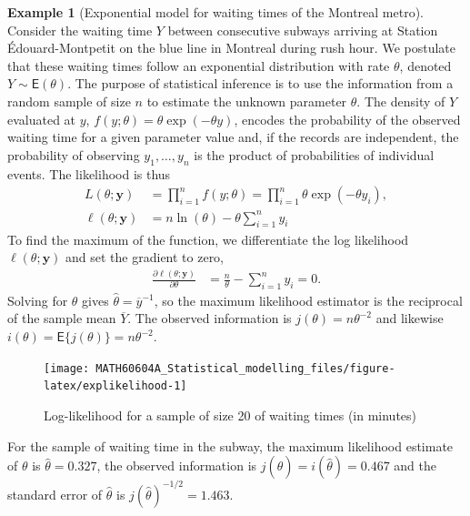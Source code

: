 \documentclass[
  11pt,
  letterpaper,
]{book}
\theoremstyle{definition}
\theoremstyle{definition}
\newtheorem{example}{Example}[chapter]
\theoremstyle{definition}
\theoremstyle{definition}
\theoremstyle{remark}
\begin{document}
\begin{example}[Exponential model for waiting times of the Montreal metro]
\protect\hypertarget{exm:waitingtime}{}{\label{exm:waitingtime} {} }Consider the waiting time \(Y\) between consecutive subways arriving at Station Édouard-Montpetit on the blue line in Montreal during rush hour. We postulate that these waiting times follow an exponential distribution with rate \(\theta\), denoted \(Y \sim \mathsf{E}(\theta)\). The purpose of statistical inference is to use the information from a random sample of size \(n\) to estimate the unknown parameter \(\theta\). The density of \(Y\) evaluated at \(y\), \(f(y; \theta)=\theta\exp(-\theta y)\), encodes the probability of the observed waiting time for a given parameter value and, if the records are independent, the probability of observing \(y_1, \ldots, y_n\) is the product of probabilities of individual events. The likelihood is thus
\begin{align*}
L(\theta; \boldsymbol{y}) &= \prod_{i=1}^n f(y; \theta)= \prod_{i=1}^n\theta\exp(-\theta y_i),\\
\ell(\theta; \boldsymbol{y}) & = n\ln(\theta) - \theta\sum_{i=1}^n y_i
\end{align*}
To find the maximum of the function, we differentiate the log likelihood \(\ell(\theta; \boldsymbol{y})\) and set the gradient to zero,
\begin{align*}
\frac{\partial \ell(\theta; \boldsymbol{y})}{\partial \theta} & = \frac{n}{\theta} - \sum_{i=1}^n y_i =0.
\end{align*}
Solving for \(\theta\) gives \(\widehat{\theta} = \overline{y}^{-1}\), so the maximum likelihood estimator is the reciprocal of the sample mean \(\overline{Y}\). The observed information is \(j(\theta) = n\theta^{-2}\) and likewise \(i(\theta)=\mathsf{E}\{j(\theta)\}=n\theta^{-2}\).
\end{example}

\begin{figure}

{\centering \texttt{[image: MATH60604A\_Statistical\_modelling\_files/figure-latex/explikelihood-1]} 

}

\caption{Log-likelihood for a sample of size 20 of waiting times (in minutes)}\label{fig:explikelihood}
\end{figure}

For the sample of waiting time in the subway, the maximum likelihood estimate of \(\theta\) is \(\widehat{\theta}=0.327\), the observed information is \(j(\widehat{\theta})=i(\widehat{\theta})=0.467\) and the standard error of \(\widehat{\theta}\) is \(j(\widehat{\theta})^{-1/2}=1.463\).
\end{document}
